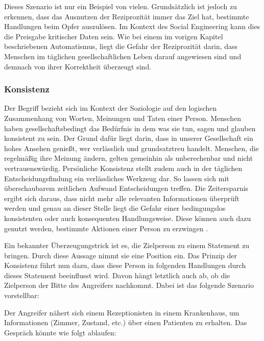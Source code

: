 Dieses Szenario ist nur ein Beispiel von vielen. Grundsätzlich ist jedoch zu erkennen, dass das Ausnutzen der Reziprozität immer das Ziel hat, bestimmte Handlungen beim Opfer auszulösen. Im Kontext des Social Engineering kann dies die Preisgabe kritischer Daten sein. Wie bei einem im vorigen Kapitel beschriebenen Automatismus, liegt die Gefahr der Reziprozität darin, dass Menschen im täglichen gesellschaftlichen Leben darauf angewiesen sind und demnach von ihrer Korrektheit überzeugt sind.

\subsubsection{Konsistenz}

Der Begriff  bezieht sich im Kontext der Soziologie auf den logischen Zusammenhang von Worten, Meinungen und Taten einer Person.
Menschen haben gesellschaftsbedingt das Bedürfnis in dem was sie tun, sagen und glauben konsistent zu sein.
Der Grund dafür liegt darin, dass in unserer Gesellschaft ein hohes Ansehen genießt, wer verlässlich und grundsatztreu handelt.
Menschen, die regelmäßig ihre Meinung ändern, gelten gemeinhin als unberechenbar und nicht vertrauenswürdig.
Persönliche Konsistenz stellt zudem auch in der täglichen Entscheidungsfindung ein verlässliches Werkzeug dar.
So lassen sich mit überschaubarem zeitlichen Aufwand Entscheidungen treffen.
Die Zeitersparnis ergibt sich daraus, dass nicht mehr alle relevanten Informationen überprüft werden und genau an dieser Stelle liegt die Gefahr einer bedingungslos konsistenten oder auch konsequenten Handlungsweise. Diese können auch dazu genutzt werden, bestimmte Aktionen einer Person zu erzwingen \citep{cialdini}.

Ein bekannter Überzeugungstrick ist es, die Zielperson zu einem Statement zu bringen. Durch diese Aussage nimmt sie eine Position ein. Das Prinzip der Konsistenz führt nun dazu, dass diese Person in folgenden Handlungen durch dieses Statement beeinflusst wird. Davon hängt letztlich auch ab, ob die Zielperson der Bitte des Angreifers nachkommt. Dabei ist das folgende Szenario vorstellbar:

Der Angreifer nähert sich einem Rezeptionisten in einem Krankenhaus, um Informationen (Zimmer, Zustand, etc.) über einen Patienten zu erhalten.
Das Gespräch könnte wie folgt ablaufen:

 


